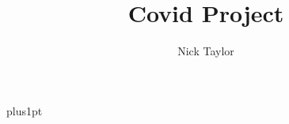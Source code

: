 \documentclass[12pt]{ociamthesis}
\title{Covid Project}
\author{Nick Taylor}             %
\begin{document}
\baselineskip=18pt plus1pt

\setcounter{secnumdepth}{3}
\setcounter{tocdepth}{3}


\begin{romanpages}          %
\tableofcontents            %
\end{romanpages}            %







\renewcommand{\bibname}{References}

\appendix
\renewcommand\chaptermark[1]{\markboth{\sffamily\normalsize\bfseries \appendixname~\thechapter.}{}}

\end{document}
